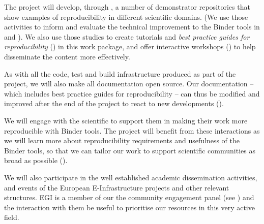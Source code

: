 \begin{workpackage}[id=education,wphases=0-36!1.14,
  title={Dissemination, education and engagement},
  short=Education,
  lead=IFR,
  IFRRM=16,
  MPRM=6,
  SRLRM=7,
  QSRM=3,
  UIORM=9,
  swsites
]
\begin{wpdescription}

  The \TheProject project will develop, through , a number
  of demonstrator repositories that show examples of reproducibility in
  different scientific domains. (We use
  those activities to inform and evaluate the technical improvement to the
  Binder tools in  and ). We also use those
  studies to create tutorials and \emph{best practice guides for
    reproducibility} () in this work package, and
  offer interactive workshops () to help disseminate the
  content more effectively.

  As with all the code, test and build infrastructure produced as part of the
  project, we will also make all documentation open source. Our documentation --
  which includes best practice guides for reproducibility -- can thus be
  modified and improved after the end of the project to react to new
  developments ().

  We will engage with the scientific to support them in making their
  work more reproducible with Binder tools. The project will benefit from these interactions
  as we will learn more about reproducibility requirements and usefulness of the
  Binder tools, so that we can tailor our work to support scientific communities as broad as possible
  ().

  We will also participate in the well established academic dissemination
  activities, and events of the European E-Infrastructure projects and other
  relevant structures. EGI is a member of our the community engagement panel
  (see )
  and the interaction with them be useful to prioritise our resources in this
  very active field.


\end{wpdescription}
\end{workpackage}
